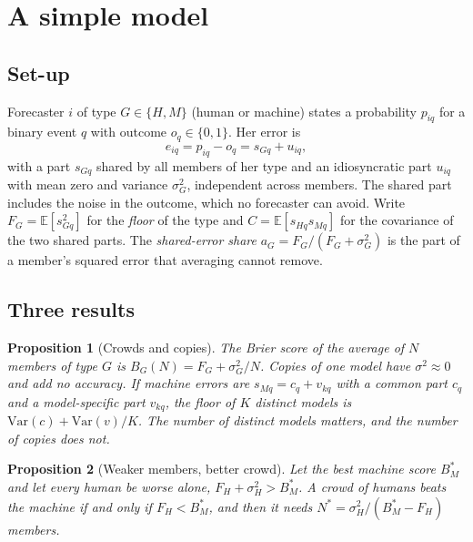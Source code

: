 \documentclass[11pt,a4paper]{article}
\newtheorem{proposition}{Proposition}
\theoremstyle{definition}
\begin{document}
\section{A simple model}\label{sec:model}

\subsection{Set-up}

Forecaster $i$ of type $G\in\{H,M\}$ (human or machine) states a probability $p_{iq}$ for a binary event $q$ with outcome $o_q\in\{0,1\}$. Her error is
\begin{equation}\label{eq:error}
e_{iq}=p_{iq}-o_q=s_{Gq}+u_{iq},
\end{equation}
with a part $s_{Gq}$ shared by all members of her type and an idiosyncratic part $u_{iq}$ with mean zero and variance $\sigma^2_G$, independent across members. The shared part includes the noise in the outcome, which no forecaster can avoid. Write $F_G=\mathbb{E}[s_{Gq}^2]$ for the \emph{floor} of the type and $C=\mathbb{E}[s_{Hq}s_{Mq}]$ for the covariance of the two shared parts. The \emph{shared-error share} $a_G=F_G/(F_G+\sigma^2_G)$ is the part of a member's squared error that averaging cannot remove.

\subsection{Three results}

\begin{proposition}[Crowds and copies]\label{prop:crowd}
The Brier score of the average of $N$ members of type $G$ is $B_G(N)=F_G+\sigma^2_G/N$. Copies of one model have $\sigma^2\approx0$ and add no accuracy. If machine errors are $s_{Mq}=c_q+v_{kq}$ with a common part $c_q$ and a model-specific part $v_{kq}$, the floor of $K$ distinct models is $\mathrm{Var}(c)+\mathrm{Var}(v)/K$. The number of distinct models matters, and the number of copies does not.
\end{proposition}

\begin{proposition}[Weaker members, better crowd]\label{prop:nstar}
Let the best machine score $B_M^*$ and let every human be worse alone, $F_H+\sigma_H^2>B_M^*$. A crowd of humans beats the machine if and only if $F_H<B_M^*$, and then it needs $N^*=\sigma^2_H/(B_M^*-F_H)$ members.
\end{proposition}
\end{document}
